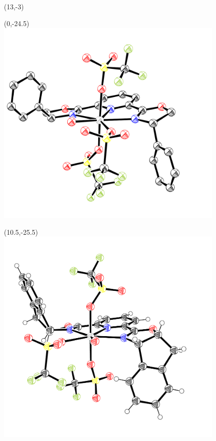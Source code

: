 \begin{figure}[p]
   \begin{textblock}{1}(13,-3)  \end{textblock}
   \begin{textblock}{1}(0,-24.5)
   \includegraphics[scale=0.35]{chp_asymmetric/images/evanspybox2ortep}\end{textblock}
   \begin{textblock}{1}(10.5,-25.5)
   \includegraphics[scale=0.4]{chp_asymmetric/images/evanspyboxortep}\end{textblock}

\end{figure}
